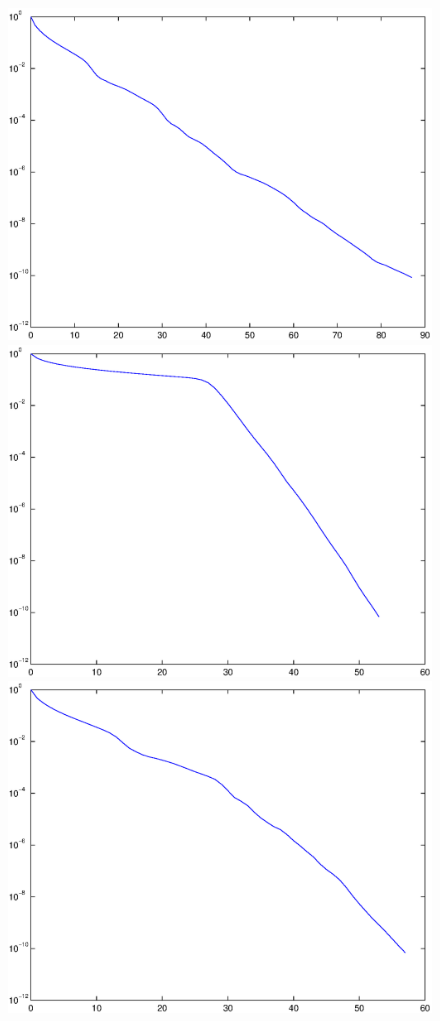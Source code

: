 \begin{figure}
\hfill
\includegraphics[scale=0.35]{eps/mp3e1n20k16.eps}
\\
\includegraphics[scale=0.35]{eps/mp3e50n20k64.eps}
\hfill
\includegraphics[scale=0.35]{eps/mp3e1n20k64.eps}

\end{figure}

